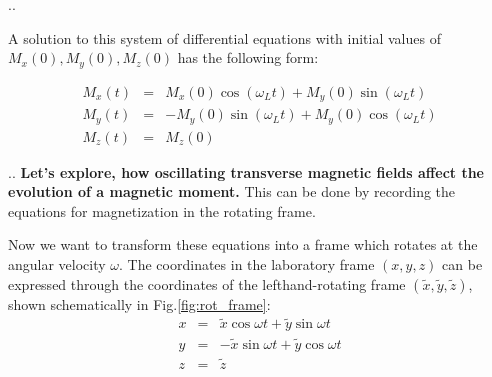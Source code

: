 \documentclass[handout]{beamer}
\begin{document}
\begin{frame}[shrink=5]{\thesection.\thesubsection. \insertsubsection}
		    
		    A solution to this system of differential equations with initial values of $M_x(0), M_y(0), M_z(0)$ has the following form:
		    
		    \begin{equation} 
		    \begin{array}{lcl}
		    M_x(t) &=& M_x(0) \cos(\omega_L t) + M_y(0) \sin (\omega_L t) \\
		    M_y(t) &=& -M_y(0) \sin(\omega_L t) + M_y(0) \cos (\omega_L t) \\
		    M_z(t) &=& M_z(0) 
		    \end{array}
		    \end{equation}		

		    	    
\end{frame}
\begin{frame}[shrink=5]{\thesection.\thesubsection. \insertsubsection}
  \textbf{ Let's explore, how oscillating transverse magnetic fields affect the evolution of a magnetic moment.}
  This can be done by recording the equations for magnetization in the \alert{rotating frame}.
	
  
  Now we  want to transform these equations into a frame which rotates at the angular velocity $\omega$.  The coordinates in the laboratory frame $(x,y,z)$ can be expressed through the coordinates of the lefthand-rotating frame $(\tilde{x}, \tilde{y}, \tilde{z})$, shown schematically in Fig.\ref{fig:rot_frame}:
 \begin{equation}
 \begin{array}{lcl}
 x &=& \tilde{x} \cos \omega t + \tilde{y} \sin \omega t \\
 y &=& -\tilde{x} \sin \omega t + \tilde{y} \cos \omega t \\
 z &=& \tilde{z}
 \end{array}
 \end{equation}
 

\end{frame}
\end{document}
